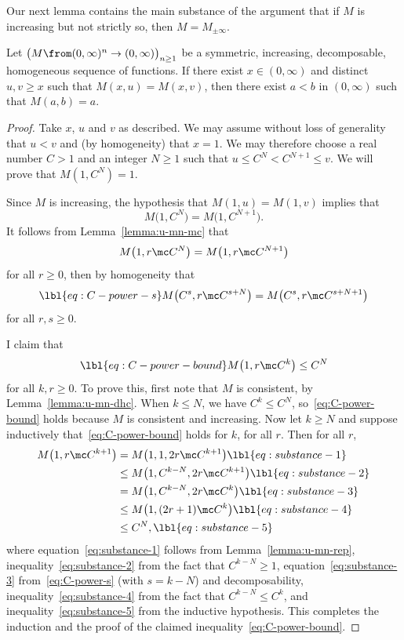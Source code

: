 Our next lemma contains the main substance of the argument that if $M$ is
increasing but not strictly so, then $M = M_{\pm\infty}$.

\begin{lemma}
Let $\bigl(M \from (0, \infty)^n \to (0, \infty)\bigr)_{n \geq 1}$ be a
symmetric, increasing, decomposable, homogeneous sequence of functions.  If
there exist $x \in (0, \infty)$ and distinct $u, v \geq x$ such that $M(x,
u) = M(x, v)$, then there exist $a < b$ in $(0, \infty)$ such that $M(a, b)
= a$.
\end{lemma}

\begin{proof}
Take $x$, $u$ and $v$ as described.  We may assume without loss of
generality that $u < v$ and (by homogeneity) that $x = 1$.  We may
therefore choose a real number $C > 1$ and an integer $N \geq 1$ such that
$u \leq C^N < C^{N + 1} \leq v$.  We will prove that $M(1, C^N) = 1$.

Since $M$ is increasing, the hypothesis that $M(1, u) = M(1, v)$ implies
that
\[
M\bigl(1, C^N\bigr) = M\bigl(1, C^{N + 1}\bigr).  
\]
It follows from Lemma~\ref{lemma:u-mn-mc} that
\[
M\bigl(1, r \mc C^N\bigr) = M\bigl(1, r \mc C^{N + 1}\bigr)
\]
for all $r \geq 0$, then by homogeneity that
% 
\begin{equation}
\lbl{eq:C-power-s}
M\bigl(C^s, r \mc C^{s + N}\bigr) 
=
M\bigl(C^s, r \mc C^{s + N + 1}\bigr) 
\end{equation}
% 
for all $r, s \geq 0$.  

I claim that 
% 
\begin{equation}
\lbl{eq:C-power-bound}
M\bigl(1, r \mc C^k\bigr) \leq C^N
\end{equation}
% 
for all $k, r \geq 0$.  To prove this, first note that $M$ is consistent, by
Lemma~\ref{lemma:u-mn-dhc}.  When $k \leq N$, we have $C^k \leq C^N$, 
so~\eqref{eq:C-power-bound} holds because $M$ is consistent and increasing.
Now let $k \geq N$ and suppose inductively that~\eqref{eq:C-power-bound}
holds for $k$, for all $r$.  Then for all $r$,
% 
\begin{align}
M\bigl(1, r \mc C^{k + 1}\bigr)   &
=
M\bigl(1, 1, 2r \mc C^{k + 1}\bigr)       
\lbl{eq:substance-1}  \\
&
\leq
M\bigl(1, C^{k - N}, 2r \mc C^{k + 1}\bigr)      
\lbl{eq:substance-2}  \\
&
=
M\bigl(1, C^{k - N}, 2r \mc C^k\bigr)     
\lbl{eq:substance-3}  \\
&
\leq
M\bigl(1, (2r + 1) \mc C^k\bigr)  
\lbl{eq:substance-4}  \\
&
\leq 
C^N,
\lbl{eq:substance-5}  
\end{align}
% 
where equation~\eqref{eq:substance-1} follows from
Lemma~\ref{lemma:u-mn-rep}, inequality~\eqref{eq:substance-2} from the fact
that $C^{k - N} \geq 1$, equation~\eqref{eq:substance-3}
from~\eqref{eq:C-power-s} (with $s = k - N$) and decomposability,
inequality~\eqref{eq:substance-4} from the fact that $C^{k - N} \leq C^k$,
and inequality~\eqref{eq:substance-5} from the inductive hypothesis.  This
completes the induction and the proof of the claimed
inequality~\eqref{eq:C-power-bound}.


\end{proof}
